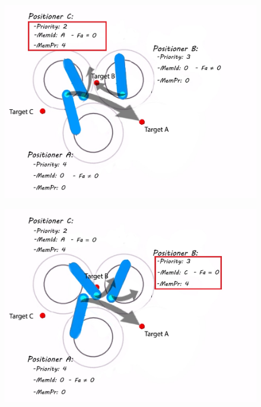 \documentclass[]{spie}  %
\begin{document}
 	\begin{figure}[H]
 		\centering
 		\begin{minipage}[t]{5.2cm}

 			\includegraphics[scale=0.3]{images/ID_PR0.jpg}
 			\label{ID_PR0}
 		\end{minipage}
 		\begin{minipage}[t]{5.4cm}
 			\includegraphics[scale=0.3]{images/ID_PR1.jpg}
 			\label{ID_PR1}
 		\end{minipage}
 		\begin{minipage}[t]{5.4cm}

\end{minipage}
\end{figure}
\end{document}
